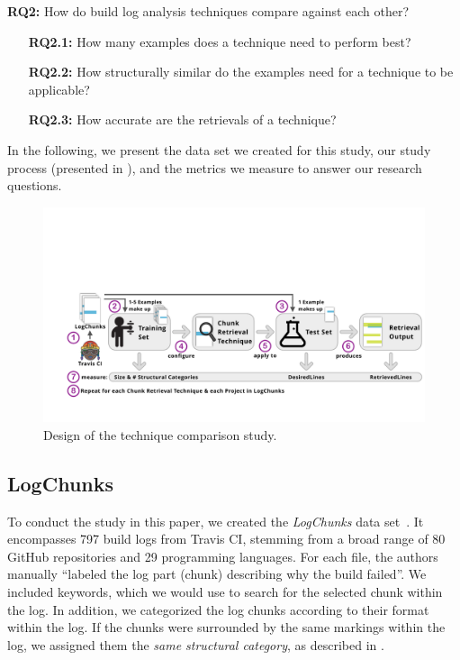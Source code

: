 \begin{simplebox}[minipage boxed title*=-1.5cm,
attach boxed title to top center={yshift=-6mm}]
{\textbf{RQ2:} How do build log analysis techniques compare against
each other?}
\begin{itemize}[leftmargin=1.2cm]
  \item[\textbf{RQ2.1:}] How many examples does a technique need to
  perform best?
  \item[\textbf{RQ2.2:}] How structurally similar do the examples
  need for a technique to be applicable?
  \item[\textbf{RQ2.3:}] How accurate are the retrievals of a technique?
\end{itemize}
\end{simplebox}

In the following, we present the data set we created for this study,
our study process (presented in ), and the metrics
we measure to answer our research questions.

\begin{figure}[tb]
	\centering
	\includegraphics[width=\textwidth, trim={1.6cm 1.6cm 0.2cm 5.6cm},
  clip]{img/study.pdf}
	\caption{Design of the technique comparison study.}
	\label{fig:study}
\end{figure}


\subsection{LogChunks}
To conduct the study in this paper, we created the
\emph{LogChunks}  data set~\cite{brandt2020logchunks}.
It encompasses 797 build logs from Travis CI,
stemming from a broad range of 80 GitHub repositories and 29
programming languages.
For each file, the authors manually ``labeled
the log part (chunk) describing why the build
failed''.
We included keywords, which we
would use to search for the selected chunk within the log.
In
addition, we categorized the log chunks according to their format
within the log.
If the chunks were surrounded by the same markings
within the log, we assigned them the \emph{same structural category},
as described in .

